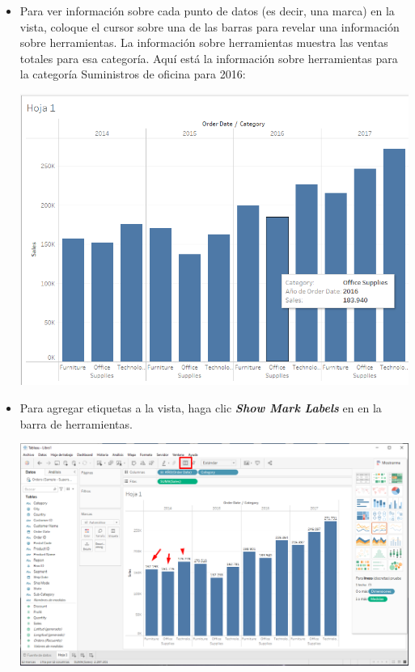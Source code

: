\documentclass[12pt,letterpaper]{article}
\begin{document}
\begin{enumerate}
\begin{center}
        \end{center}
        \begin{itemize}
            \item Para ver información sobre cada punto de datos (es decir, una marca) en la vista, coloque el cursor sobre una de las barras para revelar una información sobre herramientas. La información sobre herramientas muestra las ventas totales para esa categoría. Aquí está la información sobre herramientas para la categoría Suministros de oficina para 2016:
            \begin{center}
                \includegraphics[width=15cm]{./img/img14.png}
            \end{center}
            \item Para agregar etiquetas a la vista, haga clic \textit{\textbf{Show Mark Labels}} en en la barra de herramientas.
            \begin{center}
                \includegraphics[width=15cm]{./img/img15.png}

\end{center}
\end{itemize}
\end{enumerate}
\end{document}
